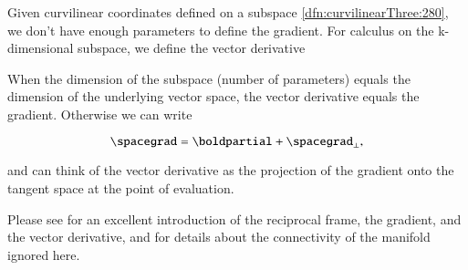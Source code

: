 %
%

Given curvilinear coordinates defined on a subspace \cref{dfn:curvilinearThree:280}, we don't have enough parameters to define the gradient.  For calculus on the k-dimensional subspace, we define the vector derivative


When the dimension of the subspace (number of parameters) equals the dimension of the underlying vector space, the vector derivative equals the gradient.  Otherwise we can write

\begin{dmath}\label{eqn:gradient:101}
\spacegrad = \boldpartial + \spacegrad_\perp,
\end{dmath}

and can think of the vector derivative as the projection of the gradient onto the tangent space at the point of evaluation.

Please see \citep{aMacdonaldVAGC} for an excellent introduction of the reciprocal frame, the gradient, and the vector derivative, and for
details about the connectivity of the manifold ignored here.

